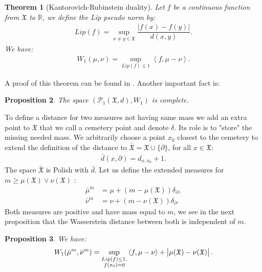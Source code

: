 \documentclass[11pt,a4paper]{article}
\newcommand{\RR}{\mathbb{R}}
\newcommand{\XF}{\mathfrak{X}}
\newcommand{\brac}[1]{\left\langle#1\right\rangle}
\newtheorem{theorem}{Theorem}[section]
\newtheorem{proposition}[theorem]{Proposition}
\begin{document}
\begin{theorem}[Kantorovich-Rubinstein duality]
    Let $f$ be a continuous function from $\XF$ to $\RR$, we define the Lip pseudo norm by:
    \begin{align*}
        Lip(f) = \sup\limits_{x \neq y \in \XF} \dfrac{\left|f(x) - f(y) \right|}{d(x,y)} .
    \end{align*}
    We have:
    \begin{align*}
        W_1(\mu,\nu) = \sup\limits_{Lip(f) \leq 1} \brac{f,\mu - \nu}.
    \end{align*}
\end{theorem}
A proof of this theorem can be found in \cite{santambrogio2015optimal}. Another important fact is:
\begin{proposition}
    The space $\left( \mathcal{P}_1(\XF,d),W_1\right) $ is complete.
\end{proposition}
To define a distance for two measures not having same mass we add an extra point to $\XF$ that we call a cemetery point and denote $\delta$. Its role is to "store" the missing needed mass. We arbitrarily choose a point $x_0$ closest to the cemetery to extend the definition of the distance to $\bar{\XF} = \XF\cup \lbrace\partial\rbrace$, for all $x \in \XF$:
\begin{align*}
    \bar{d}(x,\partial) = d_{x,x_0} + 1.
\end{align*}
The space $\bar{\XF}$ is Polish with $\bar{d}$. Let us define the extended measures for $m\geq \mu(\XF) \vee \nu(\XF)$ :
\begin{align*}
    \bar{\mu}^m &= \mu + (m-\mu(\XF))\delta_{\partial}, \\
    \bar{\nu}^m &= \nu + (m-\nu(\XF))\delta_{\partial}.
\end{align*}
Both measures are positive and have mass equal to $m$, we see in the next proposition that the Wasserstein distance between both is independent of $m$.
\begin{proposition}\label{prop:Kantorovich-general}
    We have:
    \begin{align*}
        W_1(\bar{\mu}^m,\bar{\nu}^m) = \sup\limits_{\substack{Lip(f) \leq 1,\\ f(x_0) = 0}} \brac{f,\mu - \nu} + \left|\vphantom{A^2}\mu(\XF) - \nu(\XF) \right|.
    \end{align*}
\end{proposition}
\end{document}

